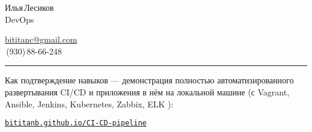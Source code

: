 \documentclass[11pt, a4paper]{article}
\newcommand\rurl[1]{%
  \href{http://#1}{\nolinkurl{#1}}%
}
\newcommand\Eng[1]{%
  \foreignlanguage{english}{#1}%
}
\begin{document}
\sffamily

{\setlength\multicolsep{0pt}%
\begin{multicols}{2}

\begin{spacing}{1.5}
  {\LARGE Илья\,Лесиков}\\
  {\Large\Eng{DevOps}}\hspace{1.3cm}{\large 25\,лет}
\end{spacing}

\columnbreak

\begin{flushright}
  \begin{spacing}{1.3}
    {\large\href{mailto:bititanc@gmail.com}{\Eng{bititanc@gmail.com}}}\\
    \fontsize{1.4em}{0}\,(930)\,88-66-248 \normalsize\\
  \end{spacing}
\end{flushright}

\end{multicols}
}

\vspace{-10pt}
\textcolor[RGB]{220,220,220}{\rule{\linewidth}{0.2pt}}
\vspace{5pt}

\begin{comment}
У меня нет образования (неоконченный колледж электроники) и сомнительный стаж (10 месяцев сисадмином).\\
Но, самообучаясь, за последние пару лет я получил достаточный опыт и в общей автоматизации, и в \Eng{CI/CD}.\\
Получил некоторый опыт и в кодинге, как и хороший общий технический бэкграунд (\Eng{Linux}, сети и т.\,п.).
\end{comment}

Как подтверждение навыков — демонстрация полностью автоматизированного развертывания \Eng{CI/CD} и приложения в нём на локальной машине (с \Eng{Vagrant, Ansible, Jenkins, Kubernetes, Zabbix, ELK}):

\rurl{bititanb.github.io/CI-CD-pipeline}
\end{document}
